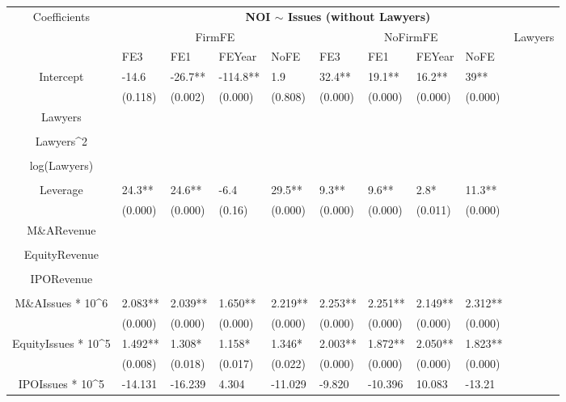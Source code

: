 \documentclass{article}
\begin{document}
\begin{table}[H]
\centering
\begin{tabular}{|clllllllll|}
\hline
\multirow{3}{*}{Coefficients} & \multicolumn{9}{c|}{\textbf{NOI $\sim$ Issues (without Lawyers)}} \\
\cline{2-10}
& \multicolumn{4}{c}{FirmFE} & \multicolumn{4}{c}{NoFirmFE} & \multirow{2}{*}{Lawyers} \\
\cline{2-9}
& FE3 & FE1 & FEYear & NoFE & FE3 & FE1 & FEYear & NoFE &  \\
\hline
 
Intercept & -14.6 & -26.7** & -114.8** & 1.9 & 32.4** & 19.1** & 16.2** & 39** & \\ 
   & (0.118) & (0.002) & (0.000) & (0.808) & (0.000) & (0.000) & (0.000) & (0.000) & \\ 
  Lawyers &  &  &  &  &  &  &  &  & \\ 
   &  &  &  &  &  &  &  &  & \\ 
  Lawyers^2 &  &  &  &  &  &  &  &  & \\ 
   &  &  &  &  &  &  &  &  & \\ 
  log(Lawyers) &  &  &  &  &  &  &  &  & \\ 
   &  &  &  &  &  &  &  &  & \\ 
  Leverage & 24.3** & 24.6** & -6.4 & 29.5** & 9.3** & 9.6** & 2.8* & 11.3** & \\ 
   & (0.000) & (0.000) & (0.16) & (0.000) & (0.000) & (0.000) & (0.011) & (0.000) & \\ 
  M\&ARevenue &  &  &  &  &  &  &  &  & \\ 
   &  &  &  &  &  &  &  &  & \\ 
  EquityRevenue &  &  &  &  &  &  &  &  & \\ 
   &  &  &  &  &  &  &  &  & \\ 
  IPORevenue &  &  &  &  &  &  &  &  & \\ 
   &  &  &  &  &  &  &  &  & \\ 
  M\&AIssues * 10^6 & 2.083** & 2.039** & 1.650** & 2.219** & 2.253** & 2.251** & 2.149** & 2.312** & \\ 
   & (0.000) & (0.000) & (0.000) & (0.000) & (0.000) & (0.000) & (0.000) & (0.000) & \\ 
  EquityIssues * 10^5 & 1.492** & 1.308* & 1.158* & 1.346* & 2.003** & 1.872** & 2.050** & 1.823** & \\ 
   & (0.008) & (0.018) & (0.017) & (0.022) & (0.000) & (0.000) & (0.000) & (0.000) & \\ 
  IPOIssues * 10^5 & -14.131 & -16.239 & 4.304 & -11.029 & -9.820 & -10.396 & 10.083 & -13.21 & \\ 

\end{tabular}
\end{table}
\end{document}
